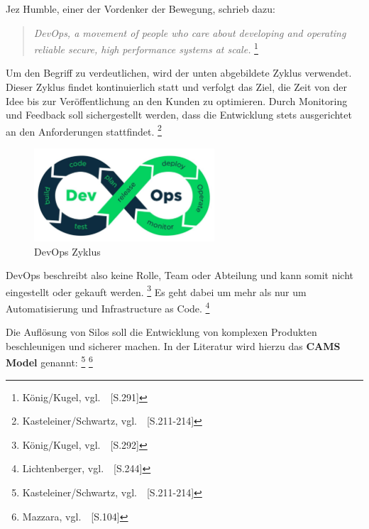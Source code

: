 \newpage

Jez Humble, einer der Vordenker der Bewegung, schrieb dazu:

\begin{quotation}
\textsl{DevOps, a movement of people who care about developing and operating reliable secure, high performance systems at scale.}
\footnote{König/Kugel, vgl.~\cite{Konig2019}~[S.291]}
\end{quotation}

Um den Begriff zu verdeutlichen, wird der unten abgebildete Zyklus verwendet.
Dieser Zyklus findet kontinuierlich statt und verfolgt das Ziel, die Zeit von der Idee bis zur Veröffentlichung an den Kunden zu optimieren.
Durch Monitoring und Feedback soll sichergestellt werden, dass die Entwicklung stets ausgerichtet an den Anforderungen stattfindet.
\footnote{Kasteleiner/Schwartz, vgl.~\cite{Kasteleiner2019}~[S.211-214]}

\begin{figure}[htb]
    \centering
    \includegraphics[width=0.6\textwidth]{images/devops_zyklus}
    \caption[DevOps Zyklus]{DevOps Zyklus \footnotemark}
    \label{fig:devops_zyklus}
\end{figure}

DevOps beschreibt also keine Rolle, Team oder Abteilung und kann somit nicht eingestellt oder gekauft werden.
\footnote{König/Kugel, vgl.~\cite{Konig2019}~[S.292]}
Es geht dabei um mehr als nur um Automatisierung und Infrastructure as Code.
\footnote{Lichtenberger, vgl.~\cite{Lichtenberger2017}~[S.244]}

Die Auflösung von Silos soll die Entwicklung von komplexen Produkten beschleunigen und sicherer machen.
In der Literatur wird hierzu das \textbf{CAMS Model} genannt:
\footnote{Kasteleiner/Schwartz, vgl.~\cite{Kasteleiner2019}~[S.211-214]}
\footnote{Mazzara, vgl.~\cite{Mazzara2019}~[S.104]}

